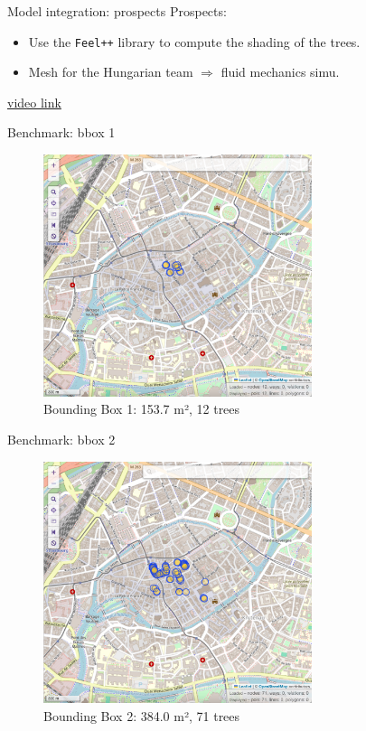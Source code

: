 \documentclass[12pt]{beamer}
\begin{document}
\begin{frame}{Model integration: prospects}
  Prospects: 
  \begin{itemize}
    \item Use the \texttt{Feel++} library to compute the shading of the trees.
    \item Mesh for the Hungarian team $\Longrightarrow$ fluid mechanics simu. 
  \end{itemize}
  \href{https://youtu.be/O6flpW6jR60}{video link}
  \begin{center}
\end{center}
\end{frame}

\begin{frame}{Benchmark: bbox 1}
  \begin{figure}[H]
    \centering
    \includegraphics[width=0.7\textwidth]{images/bbox1.png}
    \caption{Bounding Box 1: 153.7 m², 12 trees}
\end{figure}
\end{frame}

\begin{frame}{Benchmark: bbox 2}
  \begin{figure}[H]
    \centering
    \includegraphics[width=0.7\textwidth]{images/bbox2.png}
    \caption{Bounding Box 2: 384.0 m², 71 trees}
\end{figure}
\end{frame}
\end{document}
